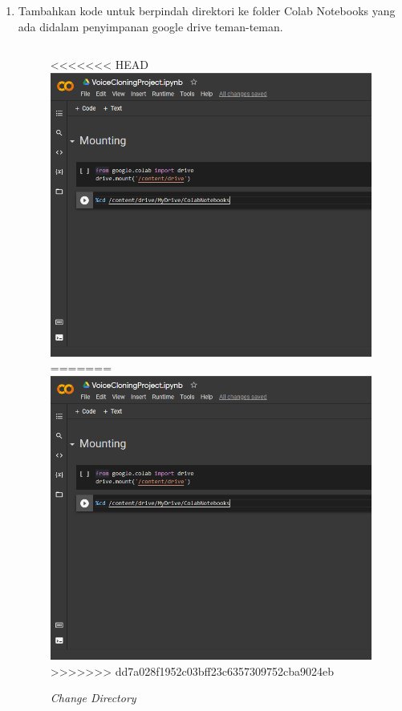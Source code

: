 \begin{enumerate}
\item Tambahkan kode untuk berpindah direktori ke folder Colab Notebooks yang ada didalam penyimpanan google drive teman-teman.
\begin{lstlisting}[language=Python, caption=Change Directory]
%cd /content/drive/MyDrive/ColabNotebooks
\end{lstlisting}
\begin{figure}[H]
    \centering
<<<<<<< HEAD
    \includegraphics[scale=0.3]{figures/colab6}
=======
    \includegraphics[scale=0.5]{figures/colab6}
>>>>>>> dd7a028f1952c03bff23c6357309752cba9024eb
    \caption{\textit{Change Directory}}
    \label{colab6}
\end{figure}


\end{enumerate}
